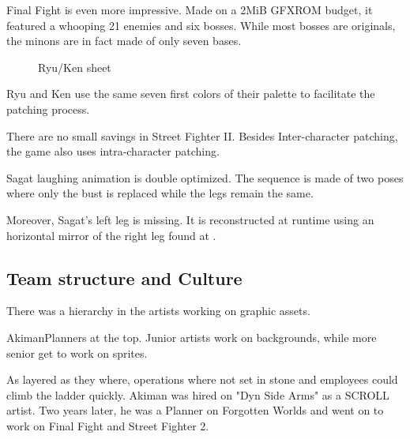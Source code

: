 Final Fight is even more impressive. Made on a 2MiB GFXROM budget, it featured a whooping 21 enemies and six bosses. While most bosses are originals, the minons are in fact made of only seven bases.

\begin{minipage}[t]{0.29\linewidth}
\end{minipage}
\hfill%
\begin{minipage}[t]{0.29\linewidth}
\end{minipage}
\hfill%
\begin{minipage}[t]{0.29\linewidth}
\end{minipage}

 \begin{figure}[H]
\caption*{Ryu/Ken sheet}
\end{figure}

Ryu and Ken use the same seven first colors of their palette to facilitate the patching process. 








There are no small savings in Street Fighter II. Besides Inter-character patching, the game also uses intra-character patching.  

Sagat laughing animation is double optimized. The sequence is made of two poses where only the bust is replaced while the legs remain the same.

Moreover, Sagat's left leg is missing. It is reconstructed at runtime using an horizontal mirror of the right leg found at .


\pagebreak

\subsection{Team structure and Culture}

There was a hierarchy in the artists working on graphic assets. 

\begin{q}{Akiman\cite{akiman2003}}Planners at the top. Junior artists work on backgrounds, while more senior get to work on sprites.
\end{q}

As layered as they where, operations where not set in stone and employees could climb the ladder quickly. Akiman was hired on "Dyn Side Arms" as a SCROLL artist. Two years later, he was a Planner on Forgotten Worlds and went on to work on Final Fight and Street Fighter 2.

